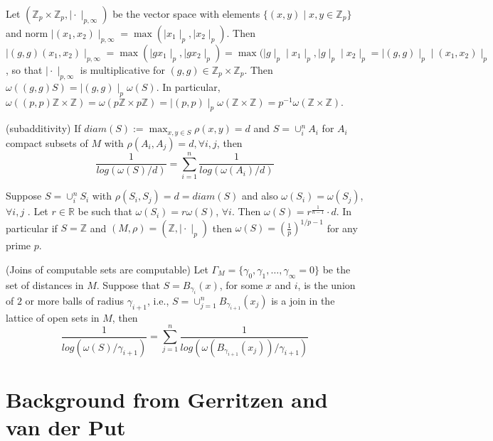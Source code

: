 \begin{example}
	Let $(\mathbb{Z}_p \times \mathbb{Z}_p, \mid \cdot \mid_{p,\infty})$ be the vector space with elements $\{(x,y)\mid x,y \in \mathbb{Z}_p\}$ and norm $ \mid (x_1,x_2) \mid_{p,\infty} = \max(\mid x_1 \mid_p,\mid x_2 \mid_p ).$ Then $\mid (g,g)(x_1,x_2) \mid_{p,\infty} = \max(\mid gx_1 \mid_p,\mid gx_2 \mid_p ) = \max(\mid g \mid_p \mid x_1 \mid_p,\mid g \mid_p \mid x_2 \mid_p=\mid (g,g) \mid_p \mid (x_1,x_2) \mid_p$, so that $\mid \cdot \mid_{p,\infty} $ is multiplicative for $(g,g) \in \mathbb{Z}_p \times \mathbb{Z}_p$. Then $\omega((g,g)S) = \mid (g,g) \mid_p\omega(S)$. In particular, $\omega((p,p)\mathbb{Z} \times \mathbb{Z}) =\omega(p\mathbb{Z} \times p\mathbb{Z})=\mid (p,p) \mid_p \omega(\mathbb{Z} \times \mathbb{Z}) =
	p^{-1} \omega(\mathbb{Z} \times \mathbb{Z}). $
\end{example}


\begin{proposition*}
	\cite{kj}(subadditivity) If  $diam(S) := \max_{x,y \in S} \rho(x,y)=d$ and $S=\cup_i^n A_i$ for $A_i$ compact subsets of $M$ with $\rho(A_i, A_j)=d, \forall i,j$, then \[\frac{1}{log(\omega(S)/d) } = \sum_{i=1}^n \frac{1}{log(\omega(A_i)/d)}\] 
\end{proposition*}

\begin{corollary*}
	Suppose $S = \cup_i^n S_i$ with $\rho(S_i, S_j)=d=diam(S)$ and also $\omega(S_i)=\omega(S_j)$, $\forall i,j$ .  Let $r \in \mathbb{R}$ be such that $\omega(S_i)=r\omega(S)$, $\forall i$. Then $\omega(S) = r^{\frac{1}{n-1}}\cdot d$. In particular if $S = \mathbb{Z}$ and $(M,\rho)= (\mathbb{Z}, \mid \cdot\mid_p)$ then $\omega(S)=(\frac{1}{p})^{1/p-1}$ for any prime $p$. 
\end{corollary*}

\begin{corollary*}
	(Joins of computable sets are computable) Let  $\Gamma_M = \{\gamma_0, \gamma_1,\ldots, \gamma_\infty=0\}$ be the set of distances in $M$. Suppose that $S = B_{\gamma_i}(x)$,  for some $x$ and $i$, is the union of $2$ or more balls of radius $\gamma_{i+1}$, i.e., $S=\cup_{j=1}^n B_{\gamma_{i+1}} (x_j)$ is a join in the lattice of open sets in $M$, then 
	\[\frac{1}{log(\omega(S)/\gamma_{i+1} )} = \sum_{j=1}^n \frac{1}{log(\omega(B_{\gamma_{i+1}}(x_j))/\gamma_{i+1} )}\]
\end{corollary*}

\section{Background from Gerritzen and van der Put}


